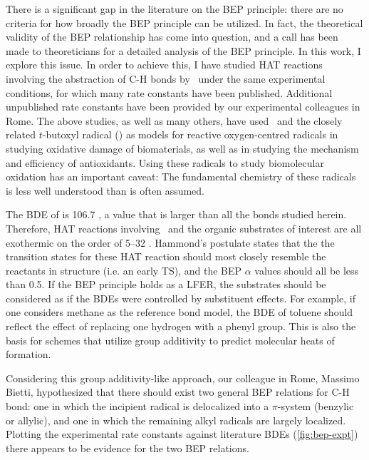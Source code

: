 There is a significant gap in the literature on the BEP principle: there are no criteria for how broadly the BEP principle can be utilized. In fact, the theoretical validity of the BEP relationship has come into question, and a call has been made to theoreticians for a detailed analysis of the BEP principle.\cite{vanSanten2010} In this work, I explore this issue. In order to achieve this, I have studied HAT reactions involving the abstraction of C-H bonds by \cumo\ under the same experimental conditions, for which many rate constants have been published.\cite{Bietti2010, Bietti2011, Pischel2001, Salamone2011, Salamone2012, Salamone2012a, Salamone2013, Salamone2015} Additional unpublished rate constants have been provided by our experimental colleagues in Rome. The above studies, as well as many others, have used \cumo\ and the closely related $t$-butoxyl radical () as models for reactive oxygen-centred radicals in studying oxidative damage of biomaterials,\cite{Adam1998, Adam2002, Jones2003} as well as in studying the mechanism and efficiency of antioxidants.\cite{MacFaul1996, Valgimigli1996, Valgimigli1999, Jovanovic1999, Sortino2003} Using these radicals to study biomolecular oxidation has an important caveat: The fundamental chemistry of these radicals is less well understood than is often assumed. \cite{Tanko2001, Finn2004, Salamone2011b}


The BDE of  is 106.7 \kcalmol, a value that is larger than all the  bonds studied herein. Therefore, HAT reactions involving \cumo\ and the organic substrates of interest are all exothermic on the order of 5--32 \kcalmol. Hammond's postulate\cite{Hammond1955} states that the the transition states for these HAT reaction should most closely resemble the reactants in structure (i.e.  an early TS), and the BEP $\alpha$ values should all be less than 0.5.\cite{Russell1973} If the BEP principle holds as a LFER, the substrates should be considered as if the BDEs were controlled by substituent effects. For example, if one considers methane as the reference  bond model, the BDE of toluene should reflect the effect of replacing one hydrogen with a phenyl group. This is also the basis for schemes that utilize group additivity to predict molecular heats of formation.\cite{Benson1976}

Considering this group additivity-like approach, our colleague in Rome, Massimo Bietti, hypothesized that there should exist two general BEP relations for C-H bond: one in which the incipient radical is delocalized into a $\pi$-system (benzylic or allylic), and one in which the remaining alkyl radicals are largely localized. Plotting the experimental rate constants against literature BDEs (\ref{fig:bep-expt}) there appears to be evidence for the two BEP relations.

